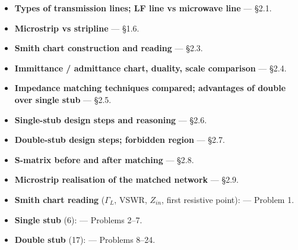 \begin{itemize}
  \item \textbf{Types of transmission lines; LF line vs microwave line} --- \S2.1.
  \item \textbf{Microstrip vs stripline} --- \S1.6. 
  \item \textbf{Smith chart construction and reading} --- \S2.3.
  \item \textbf{Immittance / admittance chart, duality, scale comparison} --- \S2.4.
  \item \textbf{Impedance matching techniques compared; advantages of double over single
    stub} --- \S2.5. 
  \item \textbf{Single-stub design steps and reasoning} --- \S2.6.
  \item \textbf{Double-stub design steps; forbidden region} --- \S2.7.
  \item \textbf{S-matrix before and after matching} --- \S2.8. 
  \item \textbf{Microstrip realisation of the matched network} --- \S2.9.
\end{itemize}

\begin{itemize}
  \item \textbf{Smith chart reading} ($\Gamma_L$, VSWR, $Z_{in}$, first resistive point):
      --- Problem 1.
  \item \textbf{Single stub} (6):  --- Problems 2--7.
  \item \textbf{Double stub} (17):  --- Problems 8--24.
\end{itemize}

